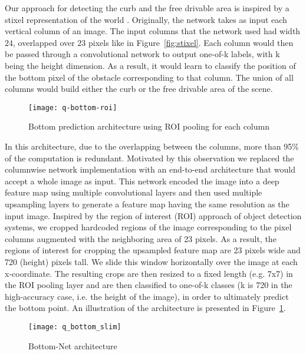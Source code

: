 \documentclass[10pt,twocolumn,letterpaper]{article}
\begin{document}
Our approach for detecting the curb and the free drivable area is inspired by a stixel representation of the world \cite{stixel-world} \cite{stixelnet}. Originally, the network takes as input each vertical column of an image. The input columns that the network used had width $24$, overlapped over $23$ pixels like in Figure~\ref{fig:stixel}. Each column would then be passed through a convolutional network to output one-of-k labels, with k being the height dimension. As a result, it would learn to classify the position of the bottom pixel of the obstacle corresponding to that column. The union of all columns would build either the curb or the free drivable area of the scene.
\begin{figure}[t]
\begin{center}
\texttt{[image: q-bottom-roi]}
\end{center}
   \caption{Bottom prediction architecture using ROI pooling for each column}
\label{fig:q-bottom-roi}
\end{figure}

In this architecture, due to the overlapping between the columns, more than 95$\%$ of the computation is redundant. Motivated by this observation we replaced the columnwise network implementation with an end-to-end architecture that would accept a whole image as input. This network encoded the image into a deep feature map using multiple convolutional layers and then used multiple upsampling layers to generate a feature map having the same resolution as the input image. Inspired by the region of interest (ROI) approach of object detection systems, we cropped hardcoded regions of the image corresponding to the pixel columns augmented with the neighboring area of 23 pixels. As a result, the regions of interest for cropping the upsampled feature map are 23 pixels wide and 720 (height) pixels tall. We slide this window horizontally over the image at each x-coordinate. The resulting crops are then resized to a fixed length (e.g. 7x7) in the ROI pooling layer and are then classified to one-of-k classes (k is 720 in the high-accuracy case, i.e. the height of the image), in order to ultimately predict the bottom point. An illustration of the architecture is presented in Figure~\ref{fig:q-bottom-roi}. 
\begin{figure*}
\begin{center}
\texttt{[image: q\_bottom\_slim]}
\end{center}
   \caption{Bottom-Net architecture}
\label{fig:q_bottom_slim}
\end{figure*}
\end{document}
